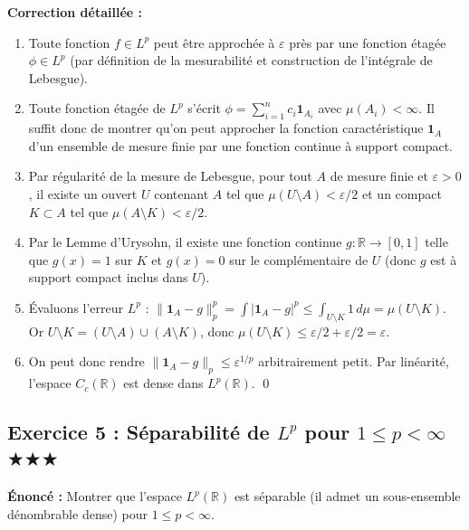 \documentclass[11pt,a4paper]{article}
\begin{document}
\textbf{Correction détaillée :}
\begin{enumerate}
\item Toute fonction $f \in L^p$ peut être approchée à $\varepsilon$ près par une fonction étagée $\phi \in L^p$ (par définition de la mesurabilité et construction de l'intégrale de Lebesgue).
\item Toute fonction étagée de $L^p$ s'écrit $\phi = \sum_{i=1}^n c_i \mathbf{1}_{A_i}$ avec $\mu(A_i) < \infty$. Il suffit donc de montrer qu'on peut approcher la fonction caractéristique $\mathbf{1}_A$ d'un ensemble de mesure finie par une fonction continue à support compact.
\item Par régularité de la mesure de Lebesgue, pour tout $A$ de mesure finie et $\varepsilon > 0$, il existe un ouvert $U$ contenant $A$ tel que $\mu(U \setminus A) < \varepsilon/2$ et un compact $K \subset A$ tel que $\mu(A \setminus K) < \varepsilon/2$.
\item Par le Lemme d'Urysohn, il existe une fonction continue $g : \mathbb{R} \to [0,1]$ telle que $g(x) = 1$ sur $K$ et $g(x) = 0$ sur le complémentaire de $U$ (donc $g$ est à support compact inclus dans $U$).
\item Évaluons l'erreur $L^p$ :
   $\|\mathbf{1}_A - g\|_p^p = \int |\mathbf{1}_A - g|^p \le \int_{U \setminus K} 1 \, d\mu = \mu(U \setminus K)$.
   Or $U \setminus K = (U \setminus A) \cup (A \setminus K)$, donc $\mu(U \setminus K) \le \varepsilon/2 + \varepsilon/2 = \varepsilon$.
\item On peut donc rendre $\|\mathbf{1}_A - g\|_p \le \varepsilon^{1/p}$ arbitrairement petit. Par linéarité, l'espace $C_c(\mathbb{R})$ est dense dans $L^p(\mathbb{R})$. \qed
\end{enumerate}


\subsection*{Exercice 5 : Séparabilité de $L^p$ pour $1 \le p < \infty$ \quad $\bigstar\bigstar\bigstar$}
\textbf{Énoncé :}
Montrer que l'espace $L^p(\mathbb{R})$ est séparable (il admet un sous-ensemble dénombrable dense) pour $1 \le p < \infty$.
\end{document}
